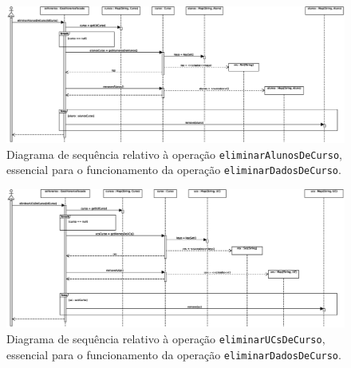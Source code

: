 \documentclass[12pt, a4paper]{article}
\begin{document}
\begin{landscape}
        \vspace*{\fill}
        \pagebreak
        \vspace*{\fill}

        \begin{figure}[H]
            \centering
            \includegraphics[scale=0.70]{Imagens/Modelos/eliminarAlunosDeCurso.svg.eps}
            \caption{
                Diagrama de sequência relativo à operação \texttt{eliminarAlunosDeCurso}, essencial
                para o funcionamento da operação \texttt{eliminarDadosDeCurso}.
            }
        \end{figure}

        \vspace*{\fill}
        \pagebreak
        \vspace*{\fill}

        \begin{figure}[H]
            \centering
            \includegraphics[scale=0.70]{Imagens/Modelos/eliminarUCsDeCurso.svg.eps}
            \caption{
                Diagrama de sequência relativo à operação \texttt{eliminarUCsDeCurso}, essencial
                para o funcionamento da operação \texttt{eliminarDadosDeCurso}.
            }
        \end{figure}

        \vspace*{\fill}
        \pagebreak
        \vspace*{\fill}


\end{landscape}
\end{document}
